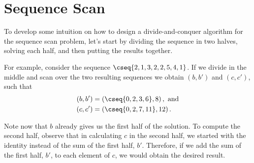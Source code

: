 \section{Sequence Scan}
\label{sec:design::dc::scan}

\begin{cluster}
\label{grp:grm:design::dc::intuition-for-scan-with-divide-and-conquer}

\begin{gram}
\label{grm:design::dc::intuition-for-scan-with-divide-and-conquer}
To develop some intuition on how to design a divide-and-conquer
algorithm for the sequence scan problem, let's start by
dividing the sequence in two halves, solving each half, and then
putting the results together. 

For example,  consider the sequence $\cseq{2,1,3,2,2,5,4,1}$.
If we divide in the middle and scan over the two resulting sequences
we obtain $(b,b')$ and $(c,c')$, such that 
\[ \begin{align*}
(b, b') & = \left(\cseq{0, 2, 3, 6}, 8 \right),~\mbox{and}
\\
(c, c') & = \left(\cseq{0, 2, 7, 11}, 12\right).
\end{align*} \]

Note now that $b$ already gives us the first half of the solution.
To compute the second half, observe that in calculating $c$ in the
second half, we started with the identity instead of the sum of the
first half, $b'$.  
Therefore, if we add the sum of the first half, $b'$, to each element
of $c$, we would obtain the desired result.  

\end{gram}
\end{cluster}

